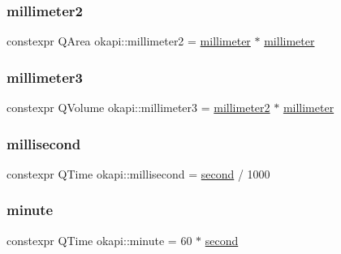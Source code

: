\subsubsection{\texorpdfstring{millimeter2}{millimeter2}}
{\footnotesize\ttfamily constexpr Q\+Area okapi\+::millimeter2 = \mbox{\hyperlink{namespaceokapi_a9343219094a8231c1e3bc95505ba1227}{millimeter}} $\ast$ \mbox{\hyperlink{namespaceokapi_a9343219094a8231c1e3bc95505ba1227}{millimeter}}}

\mbox{\label{namespaceokapi_a517d314801b2ffaeaeaa621d6be8cbdf}} 
\subsubsection{\texorpdfstring{millimeter3}{millimeter3}}
{\footnotesize\ttfamily constexpr Q\+Volume okapi\+::millimeter3 = \mbox{\hyperlink{namespaceokapi_a846f4e01f428ad9bff90f8dd7f7610d8}{millimeter2}} $\ast$ \mbox{\hyperlink{namespaceokapi_a9343219094a8231c1e3bc95505ba1227}{millimeter}}}

\mbox{\label{namespaceokapi_a2163ff1f012e1a2491d116bbeef79c71}} 
\subsubsection{\texorpdfstring{millisecond}{millisecond}}
{\footnotesize\ttfamily constexpr Q\+Time okapi\+::millisecond = \mbox{\hyperlink{namespaceokapi_ae9ece1daf9cd9f6d3a597cc5c0dc7b40}{second}} / 1000}

\mbox{\label{namespaceokapi_abce6256db60f015cf42c2b90cda699e3}} 
\subsubsection{\texorpdfstring{minute}{minute}}
{\footnotesize\ttfamily constexpr Q\+Time okapi\+::minute = 60 $\ast$ \mbox{\hyperlink{namespaceokapi_ae9ece1daf9cd9f6d3a597cc5c0dc7b40}{second}}}

\mbox{\label{namespaceokapi_aa2bafeb1e615f437ffe7b2aca205e59c}} 
